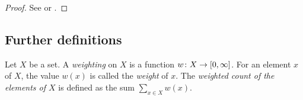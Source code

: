 \begin{proof}
 See \cite[Thm.~5.9]{Silverman2009} or \cite[7.2.1]{Lamotke2005}.
\end{proof}


\subsection{Further definitions}

\begin{defi}
 Let $X$ be a set. A \emph{weighting} on $X$ is a function $w\colon X\to[0,\infty]$. For an element $x$ of $X$, the value $w(x)$ is called the \emph{weight} of $x$. The \emph{weighted count of the elements of $X$} is defined as the sum $\sum_{x\in X}w(x)$. 
\end{defi}
